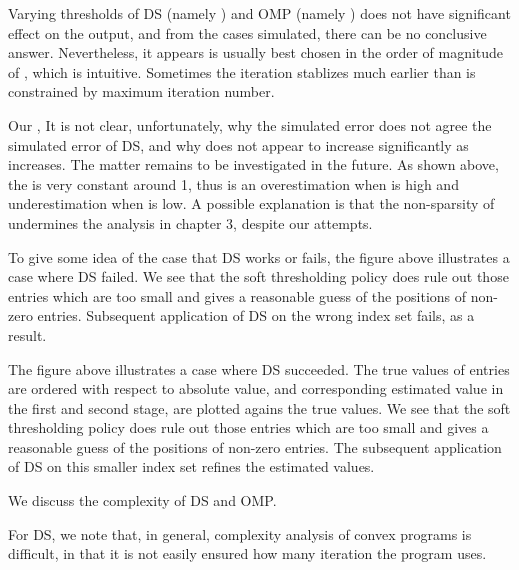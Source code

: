 Varying thresholds of DS (namely ) and OMP (namely ) does not have significant effect on the output, and from the cases simulated, there can be no conclusive answer.
Nevertheless, it appears  is usually best chosen in the order of magnitude of \m {\s}, which is intuitive.
Sometimes the iteration stablizes much earlier than is constrained by maximum iteration number.

Our \m {\T {\chi}}, 
It is not clear, unfortunately, why the simulated error \m {\T {\chi}} does not agree the simulated error \m {\chi} of DS, and why \m {\chi} does not appear to increase significantly as \m {\s} increases.
The matter remains to be investigated in the future.
As shown above, the \m {\chi} is very constant around 1, thus \m {\T {\chi}} is an overestimation when \m {\s} is high and underestimation when \m {\s} is low.
A possible explanation is that the non-sparsity of  undermines the analysis in chapter 3, despite our attempts.

\blank [big]

To give some idea of the case that DS works or fails, the figure above illustrates a case where DS failed.
We see that the soft thresholding policy does rule out those entries which are too small and gives a reasonable guess of the positions of non-zero entries.
Subsequent application of DS on the wrong index set fails, as a result.

\blank [big]

The figure above illustrates a case where DS succeeded.
The true values of  entries are ordered with respect to absolute value, and corresponding estimated value in the first and second stage, are plotted agains the true values.
We see that the soft thresholding policy does rule out those entries which are too small and gives a reasonable guess of the positions of non-zero entries.
The subsequent application of DS on this smaller index set refines the estimated values.

\stopsection

\startsection [title={Complexity}]

\startsubsection [title={Asymtotic Analysis}]

We discuss the complexity of DS and OMP.

For DS, we note that, in general, complexity analysis of convex programs is difficult, in that it is not easily ensured how many iteration the program uses.


